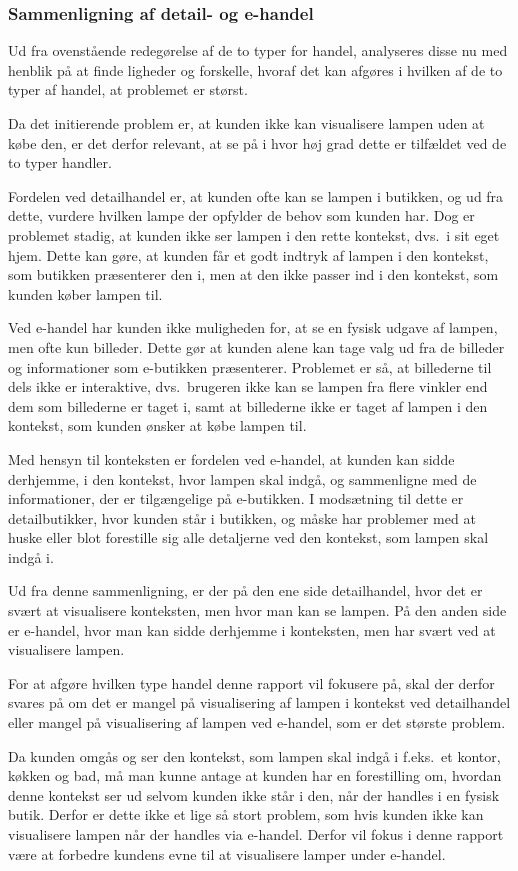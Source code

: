 \subsubsection{Sammenligning af detail- og e-handel}
Ud fra ovenstående redegørelse af de to typer for handel, analyseres disse nu med henblik på at finde ligheder og forskelle, hvoraf det kan afgøres i hvilken af de to typer af handel, at problemet er størst. 

Da det initierende problem er, at kunden ikke kan visualisere lampen uden at købe den, er det derfor relevant, at se på i hvor høj grad dette er tilfældet ved de to typer handler.

Fordelen ved detailhandel er, at kunden ofte kan se lampen i butikken, og ud fra dette, vurdere hvilken lampe der opfylder de behov som kunden har. Dog er problemet stadig, at kunden ikke ser lampen i den rette kontekst, dvs.\ i sit eget hjem. Dette kan gøre, at kunden får et godt indtryk af lampen i den kontekst, som butikken præsenterer den i, men at den ikke passer ind i den kontekst, som kunden køber lampen til.

Ved e-handel har kunden ikke muligheden for, at se en fysisk udgave af lampen, men ofte kun billeder. Dette gør at kunden alene kan tage valg ud fra de billeder og informationer som e-butikken præsenterer. Problemet er så, at billederne til dels ikke er interaktive, dvs.\ brugeren ikke kan se lampen fra flere vinkler end dem som billederne er taget i, samt at billederne ikke er taget af lampen i den kontekst, som kunden ønsker at købe lampen til. 

Med hensyn til konteksten er fordelen ved e-handel, at kunden kan sidde derhjemme, i den kontekst, hvor lampen skal indgå, og sammenligne med de informationer, der er tilgængelige på e-butikken. I modsætning til dette er detailbutikker, hvor kunden står i butikken, og måske har problemer med at huske eller blot forestille sig alle detaljerne ved den kontekst, som lampen skal indgå i.

Ud fra denne sammenligning, er der på den ene side detailhandel, hvor det er svært at visualisere konteksten, men hvor man kan se lampen. På den anden side er e-handel, hvor man kan sidde derhjemme i konteksten, men har svært ved at visualisere lampen. 

For at afgøre hvilken type handel denne rapport vil fokusere på, skal der derfor svares på om det er mangel på visualisering af lampen i kontekst ved detailhandel eller mangel på visualisering af lampen ved e-handel, som er det største problem.

Da kunden omgås og ser den kontekst, som lampen skal indgå i f.eks.\ et kontor, køkken og bad, må man kunne antage at kunden har en forestilling om, hvordan denne kontekst ser ud selvom kunden ikke står i den, når der handles i en fysisk butik. Derfor er dette ikke et lige så stort problem, som hvis kunden ikke kan visualisere lampen når der handles via e-handel. Derfor vil fokus i denne rapport være at forbedre kundens evne til at visualisere lamper under e-handel.